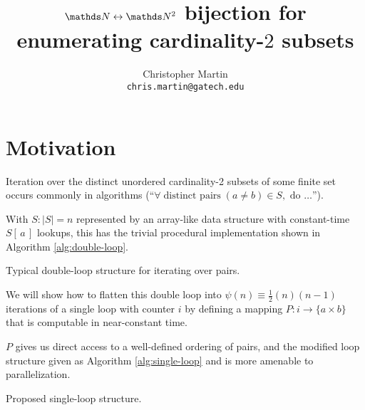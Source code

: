 \documentclass[twocolumn]{article}
\author{Christopher Martin\\{\tt chris.martin@gatech.edu}}
\date{}
\title{
$\nat \leftrightarrow \nat^2$ bijection
for enumerating cardinality-$2$ subsets
}
\newcommand\abs[1]{\ensuremath{\left\vert{#1}\right\vert}}
\newcommand\closedOpen[2]{\ensuremath{\left[\,#1,#2\,\right)}}
\newcommand\arraysub[2]{\ensuremath{#1\!\left[\,#2\,\right]}}
\begin{document}
\maketitle

\section{Motivation}

Iteration over the distinct unordered cardinality-2 subsets
of some finite set occurs commonly in algorithms
(``$\forall\;\text{distinct pairs}\;(a\neq b)\in S,\text{ do }\ldots$'').

With $S:\abs{S}=n$ represented by an array-like data
structure with constant-time $\arraysub{S}{a}$ lookups,
this has the trivial procedural implementation
shown in Algorithm \ref{alg:double-loop}.

\begin{algorithm}
  \caption{
  \label{alg:double-loop}
    Typical double-loop structure
    for iterating over pairs.
  }
  \For{
    $a\in\closedOpen{0}{n}$\;
  }{
    \For{
      $b\in\closedOpen{0}{i}$\;
    }{
      \Yield $\arraysub{S}{a}, \arraysub{S}{b}$\;
    }
  }
\end{algorithm}

We will show how to flatten this double loop into
$\psi(n)\equiv\frac{1}{2}(n)(n-1)$
iterations of a single loop with counter $i$
by defining a mapping $P : i \rightarrow \{a \times b\}$
that is computable in near-constant time.

$P$ gives us direct access to a well-defined ordering of
pairs, and the modified loop structure given as
Algorithm \ref{alg:single-loop}
and is more amenable to parallelization.

\begin{algorithm}
  \caption{Proposed single-loop structure.}
  \label{alg:single-loop}
  \For{
    $i\in\closedOpen{0}{\psi(n)}$\;
  }{
    $(a,b) \gets P(i)$\;
    \Yield $\arraysub{S}{a}, \arraysub{S}{b}$\;
  }
\end{algorithm}
\end{document}
